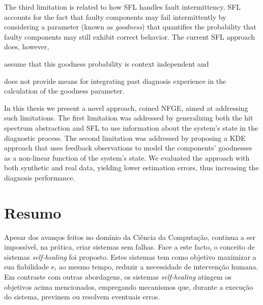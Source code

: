 The third limitation is related to how \ac{SFL} handles fault
intermittency.
%
\ac{SFL} accounts for the fact that faulty components may fail
intermittently by considering a parameter (known as \emph{goodness})
that quantifies the probability that faulty components may still
exhibit correct behavior.
%
The current \ac{SFL} approach does, however,
\begin{inparaenum}[(1)]
\item assume that this goodness probability is context independent and
\item does not provide means for integrating past diagnosis experience
  in the calculation of the goodness parameter.
\end{inparaenum}
%
In this thesis we present a novel approach, coined \acs{NFGE}, aimed at
addressing such limitations.
%
The first limitation was addressed by generalizing both the hit
spectrum abstraction and \ac{SFL} to use information about the
system's state in the diagnostic process.
%
The second limitation was addressed by proposing a \acl{KDE} approach
that uses feedback observations to model the components' goodnesses as
a non-linear function of the system's state.
%
We evaluated the approach with both synthetic and real data, yielding
lower estimation errors, thus increasing the diagnosis performance.



\renewcommand{\BrainFuckChapter}{
{+}{+}{+}{+}{+}{+}{+}{+}{[}{>}{+}{+}{+}{+}{>}{+}{+}{+}{+}{+}{+}{>}{+}{+}{+}{+}{+}{+}{+}{+}{>}{+}{+}{+}{+}{+}{+}{+}{+}{+}{+}{>}{+}{+}{+}{+}{+}{+}{+}{+}{+}{+}{+}{+}{<}{<}{<}{<}{<}{-}{]}{>}{>}{>}{>}{+}{+}{.}{>}{+}
{+}{+}{+}{+}{.}{+}{+}{+}{+}{+}{+}{+}{+}{+}{+}{+}{+}{+}{+}{.}{+}{+}{.}{-}{-}{-}{-}{-}{-}{-}{-}{.}{+}{+}{.}{[}{>}{]}{<}{[}{[}{-}{]}{<}{]}{+}{>}{+}{-}{>}{+}{<}{<}{+}{+}{>}{>}{<}{+}{-}{<}{<}{+}{+}{+}{>}{>}{>}{>}{-}
}
\chapter*{Resumo}

Apesar dos avanços feitos no domínio da Ciência da Computação,
continua a ser impossível, na prática, criar sistemas sem falhas.
%
Face a este facto, o conceito de sistemas \emph{self-healing} foi
proposto.
%
Estes sistemas tem como objetivo maximizar a sua fiabilidade e, ao
mesmo tempo, reduzir a necessidade de intervenção humana.
%
Em contraste com outras abordagens, os sistemas \emph{self-healing}
atingem os objetivos acima mencionados, empregando mecanismos que,
durante a execução do sistema, previnem ou resolvem eventuais erros.


